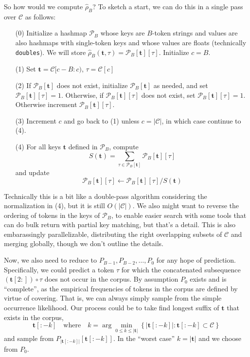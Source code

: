 \documentclass[11pt, oneside]{amsart}   	%
\begin{document}
So how would we compute $\hat{\rho}_B$? To sketch a start, we can do this in a single pass over $\mathcal{C}$ as follows: 
\begin{itemize}
	\item[(0)] Initialize a hashmap $\mathcal{P}_B$ whose keys are $B$-token strings and values are also hashmaps with single-token keys and whose values are floats (technically \texttt{doubles}). We will store $\hat{\rho}_B(\mathbf{t},\tau) = \mathcal{P}_B[\mathbf{t}][\tau]$. Initialize $c = B$. 
	\item[(1)] Set $\mathbf{t} = \mathcal{C}[c-B:c)$, $\tau = \mathcal{C}[c]$
	\item[(2)] If $\mathcal{P}_B[\mathbf{t}]$ does not exist, initialize $\mathcal{P}_B[\mathbf{t}]$ as needed, and set $\mathcal{P}_B[\mathbf{t}][\tau] = 1$. Otherwise, if $\mathcal{P}_B[\mathbf{t}][\tau]$ does not exist, set $\mathcal{P}_B[\mathbf{t}][\tau] = 1$. Otherwise increment $\mathcal{P}_B[\mathbf{t}][\tau]$. 
	\item[(3)] Increment $c$ and go back to (1) unless $c = |\mathcal{C}|$, in which case continue to (4). 
	\item[(4)] For all keys $\mathbf{t}$ defined in $\mathcal{P}_B$, compute 
	\begin{equation*}
		S(\mathbf{t}) = \sum_{\tau \in \mathcal{P}_B[\mathbf{t}]} \mathcal{P}_B[\mathbf{t}][\tau]
	\end{equation*}
	and update
	\begin{equation*}
		\mathcal{P}_B[\mathbf{t}][\tau] \leftarrow \mathcal{P}_B[\mathbf{t}][\tau] / S(\mathbf{t})
	\end{equation*}
\end{itemize}
Technically this is a bit like a double-pass algorithm considering the normalization in (4), but it is still $O(|\mathcal{C}|)$. We also might want to reverse the ordering of tokens in the keys of $\mathcal{P}_B$, to enable easier search with some tools that can do bulk return with partial key matching, but that's a detail. This is also embarassingly parallelizable, distributing the right overlapping subsets of $\mathcal{C}$ and merging globally, though we don't outline the details. 

Now, we also need to reduce to $P_{B-1}, P_{B-2}, \dotsc, P_0$ for any hope of prediction. Specifically, we could predict a token $\tau$ for which the concatenated subsequence $(\mathbf{t}[2:]) \circ \tau$ does not occur in the corpus. By assumption $P_0$ exists and is ``complete'', as the empirical frequencies of tokens in the corpus are defined by virtue of covering. That is, we can always simply sample from the simple occurrence likelihood. Our process could be to take find longest suffix of $\mathbf{t}$ that exists in the corpus, 
\begin{equation*}
	\mathbf{t}[:-k] 
	\quad\text{where}\quad 
	k = \arg \min_{0 \leq k \leq |\mathbf{t}|} \left\{ |\mathbf{t}[:-k] | : \mathbf{t}[:-k] \subset \mathcal{C} \right\}
\end{equation*}
and sample from $P_{|\mathbf{t}[:-k]|}[\mathbf{t}[:-k]]$. In the ``worst case'' $k = |\mathbf{t}|$ and we choose from $P_0$. 
\end{document}
